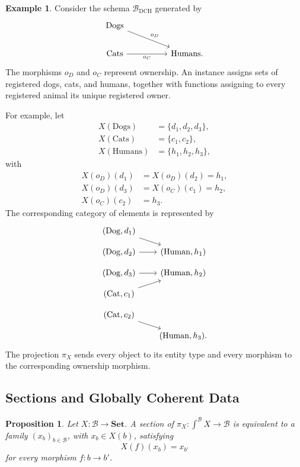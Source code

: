 \documentclass[12pt]{amsart}
\newtheorem{prop}[teo]{Proposition}
\theoremstyle{definition}
\newtheorem{example}[teo]{Example}
\theoremstyle{remark}
\numberwithin{figure}{section}%
\newcommand{\Ba}{\mathcal{B}}
\newcommand{\Sets}{\mathbf{Set}}
\begin{document}
\begin{example}\label{example:animals_database}
Consider the schema \(\Ba_{\mathrm{DCH}}\) generated by
\[
\begin{tikzcd}
\mathrm{Dogs} \arrow[rrd, "o_D"] && \\
\mathrm{Cats} \arrow[rr, "o_C"'] && \mathrm{Humans}.
\end{tikzcd}
\]
The morphisms \(o_D\) and \(o_C\) represent ownership. An instance assigns
sets of registered dogs, cats, and humans, together with functions assigning
to every registered animal its unique registered owner.

For example, let
\[
\begin{aligned}
X(\mathrm{Dogs})  &= \{d_1,d_2,d_3\}, \\
X(\mathrm{Cats})  &= \{c_1,c_2\}, \\
X(\mathrm{Humans}) &= \{h_1,h_2,h_3\},
\end{aligned}
\]
with
\[
\begin{aligned}
X(o_D)(d_1) &= X(o_D)(d_2)=h_1, \\
X(o_D)(d_3) &= X(o_C)(c_1)=h_2, \\
X(o_C)(c_2) &= h_3.
\end{aligned}
\]
The corresponding category of elements is represented by
\[
\begin{tikzcd}[column sep=2em, row sep=0.8em]
(\mathrm{Dog},d_1) \arrow[rd] & \\
(\mathrm{Dog},d_2) \arrow[r]  & (\mathrm{Human},h_1) \\
(\mathrm{Dog},d_3) \arrow[r]  & (\mathrm{Human},h_2) \\
(\mathrm{Cat},c_1) \arrow[ru] & \\
(\mathrm{Cat},c_2) \arrow[rd] & \\
                              & (\mathrm{Human},h_3).
\end{tikzcd}
\]
The projection \(\pi_X\) sends every object to its entity type and every
morphism to the corresponding ownership morphism.
\end{example}
\subsection{Sections and Globally Coherent Data}

\begin{prop}\label{prop:sections_database_coherent_families}
Let \(X\colon\Ba\to\Sets\). A section of
\(\pi_X\colon\int^\Ba X\to\Ba\) is equivalent to a family
\((x_b)_{b\in\Ba}\), with \(x_b\in X(b)\), satisfying
\[
X(f)(x_b)=x_{b'}
\]
for every morphism \(f\colon b\to b'\).
\end{prop}
\end{document}

